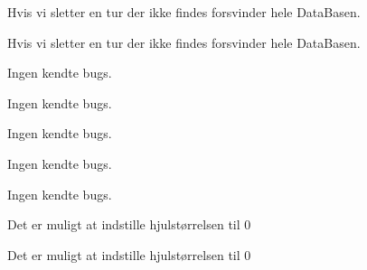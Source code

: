 
\begin{DoxyRefList}
\item[\label{bug__bug000001}%
\Hypertarget{bug__bug000001}%
File \hyperlink{DataBase_8cpp}{Data\+Base.cpp} ]Hvis vi sletter en tur der ikke findes forsvinder hele Data\+Basen.  
\item[\label{bug__bug000002}%
\Hypertarget{bug__bug000002}%
File \hyperlink{DataBase_8hpp}{Data\+Base.hpp} ]Hvis vi sletter en tur der ikke findes forsvinder hele Data\+Basen.  
\item[\label{bug__bug000003}%
\Hypertarget{bug__bug000003}%
File \hyperlink{EDBikeMain_8cpp}{E\+D\+Bike\+Main.cpp} ]Ingen kendte bugs.  
\item[\label{bug__bug000006}%
\Hypertarget{bug__bug000006}%
File \hyperlink{Message_8hpp}{Message.hpp} ]Ingen kendte bugs.  
\item[\label{bug__bug000007}%
\Hypertarget{bug__bug000007}%
File \hyperlink{MessageQ_8hpp}{MessageQ.hpp} ]Ingen kendte bugs.  
\item[\label{bug__bug000008}%
\Hypertarget{bug__bug000008}%
File \hyperlink{RideData_8cpp}{Ride\+Data.cpp} ]Ingen kendte bugs.  
\item[\label{bug__bug000009}%
\Hypertarget{bug__bug000009}%
File \hyperlink{RideData_8hpp}{Ride\+Data.hpp} ]Ingen kendte bugs.  
\item[\label{bug__bug000020}%
\Hypertarget{bug__bug000020}%
File \hyperlink{UserInterface_8cpp}{User\+Interface.cpp} ]Det er muligt at indstille hjulstørrelsen til 0  
\item[\label{bug__bug000021}%
\Hypertarget{bug__bug000021}%
File \hyperlink{UserInterface_8hpp}{User\+Interface.hpp} ]Det er muligt at indstille hjulstørrelsen til 0 
\end{DoxyRefList}